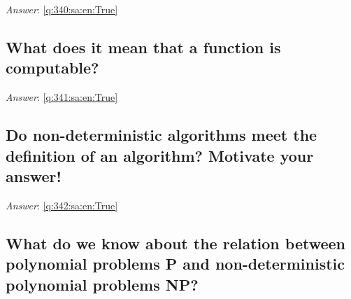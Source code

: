 \documentclass[a4paper,11pt,oneside]{article}
\begin{document}
\begin{sloppypar}
\label{q:340:sa:en:False}

\vspace{2cm}

\noindent\makebox[\textwidth]{\hrulefill}

\vspace{1cm}

\textit{Answer}: \autoref{q:340:sa:en:True}



\subsection{What does it mean that a function is computable?}

\label{q:341:sa:en:False}

\vspace{2cm}

\noindent\makebox[\textwidth]{\hrulefill}

\vspace{1cm}

\textit{Answer}: \autoref{q:341:sa:en:True}



\subsection{Do non-deterministic algorithms meet the definition of an algorithm? Motivate your answer!}

\label{q:342:sa:en:False}

\vspace{2cm}

\noindent\makebox[\textwidth]{\hrulefill}

\vspace{1cm}

\textit{Answer}: \autoref{q:342:sa:en:True}



\subsection{What do we know about the relation between polynomial problems P and non-deterministic polynomial problems NP?}

\label{q:343:sa:en:False}

\vspace{2cm}

\noindent\makebox[\textwidth]{\hrulefill}

\vspace{1cm}


\end{sloppypar}
\end{document}
